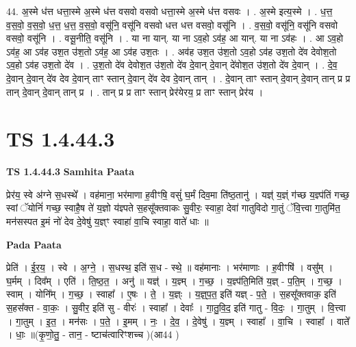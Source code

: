 \documentclass[17pt]{extarticle}
\begin{document}
44. अ॒स्मे ध॑त्त धत्ता॒स्मे अ॒स्मे ध॑त्त वसवो वसवो धत्ता॒स्मे अ॒स्मे ध॑त्त वसवः । . अ॒स्मे इत्य॒स्मे । . ध॒त्त॒ व॒स॒वो॒ व॒स॒वो॒ ध॒त्त॒ ध॒त्त॒ व॒स॒वो॒ वसू॑नि॒ वसू॑नि वसवो धत्त धत्त वसवो॒ वसू॑नि । . व॒स॒वो॒ वसू॑नि॒ वसू॑नि वसवो वसवो॒ वसू॑नि । . वसू॒नीति॒ वसू॑नि । . या ना यान्. या ना ऽव॒हो ऽव॑ह॒ आ यान्. या ना ऽव॑हः । . आ ऽव॒हो ऽव॑ह॒ आ ऽव॑ह उश॒त उ॑श॒तो ऽव॑ह॒ आ ऽव॑ह उश॒तः । . अव॑ह उश॒त उ॑श॒तो ऽव॒हो ऽव॑ह उश॒तो दे॑व देवोश॒तो ऽव॒हो ऽव॑ह उश॒तो दे॑व । . उ॒श॒तो दे॑व देवोश॒त उ॑श॒तो दे॑व दे॒वान् दे॒वान् दे॑वोश॒त उ॑श॒तो दे॑व दे॒वान् । . दे॒व॒ दे॒वान् दे॒वान् दे॑व देव दे॒वान् ताꣳ स्तान् दे॒वान् दे॑व देव दे॒वान् तान् । . दे॒वान् ताꣳ स्तान् दे॒वान् दे॒वान् तान् प्र प्र तान् दे॒वान् दे॒वान् तान् प्र । . तान् प्र प्र ताꣳ स्तान् प्रेर॑येरय॒ प्र ताꣳ स्तान् प्रेर॑य । \newline
\pagebreak
{}
\section*{ TS 1.4.44.3 }

\textbf{TS 1.4.44.3 } \newline
\textbf{Samhita Paata} \newline

प्रेर॑य॒ स्वे अ॑ग्ने स॒धस्थे᳚ । वह॑माना॒ भर॑माणा ह॒वीꣳषि॒ वसुं॑ घ॒र्मं दिव॒मा ति॑ष्ठ॒तानु॑ । यज्ञ्॑ य॒ज्ञ्ं ग॑च्छ य॒ज्ञ्प॑तिं गच्छ॒ स्वां ॅयोनिं॑ गच्छ॒ स्वाहै॒ष ते॑ य॒ज्ञो य॑ज्ञ्पते स॒हसू᳚क्तवाकः सु॒वीरः॒ स्वाहा॒ देवा॑ गातुविदो गा॒तुं ॅवि॒त्त्वा गा॒तुमि॑त॒ मन॑सस्पत इ॒मं नो॑ देव दे॒वेषु॑ य॒ज्ञ्ꣳ स्वाहा॑ वा॒चि स्वाहा॒ वाते॑ धाः ॥ \newline

\textbf{Pada Paata} \newline

प्रेति॑ । ई॒र॒य॒ । स्वे । अ॒ग्ने॒ । स॒धस्थ॒ इति॑ स॒ध - स्थे॒ ॥ वह॑मानाः । भर॑माणाः । ह॒वीꣳषि॑ । वसु᳚म् । घ॒र्मम् । दिव᳚म् । एति॑ । ति॒ष्ठ॒त॒ । अनु॑ ॥ यज्ञ्॑ । य॒ज्ञ्म् । ग॒च्छ॒ । य॒ज्ञ्प॑ति॒मिति॑ य॒ज्ञ् - प॒ति॒म् । ग॒च्छ॒ । स्वाम् । योनि᳚म् । ग॒च्छ॒ । स्वाहा᳚ । ए॒षः । ते॒ । य॒ज्ञ्ः । य॒ज्ञ्॒प॒त॒ इति॑ यज्ञ् - प॒ते॒ । स॒हसू᳚क्तवाक॒ इति॑ स॒हस᳚क्त - वा॒कः॒ । सु॒वीर॒ इति॑ सु - वीरः॑ । स्वाहा᳚ । देवाः᳚ । गा॒तु॒वि॒द॒ इति॑ गातु - वि॒दः॒ । गा॒तुम् । वि॒त्त्वा । गा॒तुम् । इ॒त॒ । मन॑सः । प॒ते॒ । इ॒मम् । नः॒ । दे॒व॒ । दे॒वेषु॑ । य॒ज्ञ्म् । स्वाहा᳚ । वा॒चि । स्वाहा᳚ । वाते᳚ । धाः॒ ॥(कृ॒णो॒तु॒ - तान॒ - ष्टाच॑त्वारिꣳशच्च )(आ44 )  \newline
\end{document}

